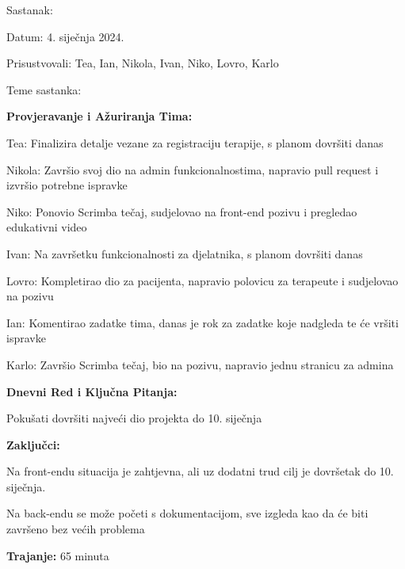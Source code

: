 \begin{packed_enum}
    \item Sastanak:
    \item[] \begin{packed_item}
        \item Datum: 4. siječnja 2024.
        \item Prisustvovali: Tea, Ian, Nikola, Ivan, Niko, Lovro, Karlo
        \item Teme sastanka:
            \begin{packed_item}
                \item \textbf{Provjeravanje i Ažuriranja Tima:}
                    \begin{packed_item}
                        \item Tea: Finalizira detalje vezane za registraciju terapije, s planom dovršiti danas
                        \item Nikola: Završio svoj dio na admin funkcionalnostima, napravio pull request i izvršio potrebne ispravke
                        \item Niko: Ponovio Scrimba tečaj, sudjelovao na front-end pozivu i pregledao edukativni video
                        \item Ivan: Na završetku funkcionalnosti za djelatnika, s planom dovršiti danas
                        \item Lovro: Kompletirao dio za pacijenta, napravio polovicu za terapeute i sudjelovao na pozivu
                        \item Ian: Komentirao zadatke tima, danas je rok za zadatke koje nadgleda te će vršiti ispravke
                        \item Karlo: Završio Scrimba tečaj, bio na pozivu, napravio jednu stranicu za admina
                    \end{packed_item}
                \item \textbf{Dnevni Red i Ključna Pitanja:}
                    \begin{packed_item}
                        \item Pokušati dovršiti najveći dio projekta do 10. siječnja
                    \end{packed_item}
                \item \textbf{Zaključci:}
                    \begin{packed_item}
                        \item Na front-endu situacija je zahtjevna, ali uz dodatni trud cilj je dovršetak do 10. siječnja.
                        \item Na back-endu se može početi s dokumentacijom, sve izgleda kao da će biti završeno bez većih problema
                    \end{packed_item}
                \item \textbf{Trajanje:} 65 minuta
            \end{packed_item}
    \end{packed_item}


\end{packed_enum}
